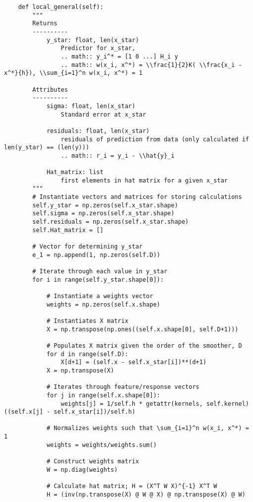 \documentclass[10pt]{article}
\begin{document}
\begin{lstlisting}
    def local_general(self):
        """
        Returns
        ----------
            y_star: float, len(x_star)
                Predictor for x_star, 
                .. math:: y_i^* = [1 0 ...] H_i y
                .. math:: w(x_i, x^*) = \\frac{1}{2}K( \\frac{x_i - x^*}{h}), \\sum_{i=1}^n w(x_i, x^*) = 1

        Attributes
        ----------
            sigma: float, len(x_star)
                Standard error at x_star

            residuals: float, len(x_star)
                residuals of prediction from data (only calculated if len(y_star) == (len(y)))
                .. math:: r_i = y_i - \\hat{y}_i

            Hat_matrix: list
                first elements in hat matrix for a given x_star
        """
        # Instantiate vectors and matrices for storing calculations
        self.y_star = np.zeros(self.x_star.shape)
        self.sigma = np.zeros(self.x_star.shape)
        self.residuals = np.zeros(self.x_star.shape)
        self.Hat_matrix = []

        # Vector for determining y_star
        e_1 = np.append(1, np.zeros(self.D))

        # Iterate through each value in y_star
        for i in range(self.y_star.shape[0]):
            
            # Instantiate a weights vector
            weights = np.zeros(self.x.shape)

            # Instantiates X matrix 
            X = np.transpose(np.ones((self.x.shape[0], self.D+1)))

            # Populates X matrix given the order of the smoother, D
            for d in range(self.D):
                X[d+1] = (self.x - self.x_star[i])**(d+1)
            X = np.transpose(X)

            # Iterates through feature/response vectors
            for j in range(self.x.shape[0]):
                weights[j] = 1/self.h * getattr(kernels, self.kernel)((self.x[j] - self.x_star[i])/self.h)

            # Normalizes weights such that \sum_{i=1}^n w(x_i, x^*) = 1 
            weights = weights/weights.sum()

            # Construct weights matrix
            W = np.diag(weights)

            # Calculate hat matrix; H = (X^T W X)^{-1} X^T W
            H = (inv(np.transpose(X) @ W @ X) @ np.transpose(X) @ W)
            

\end{lstlisting}
\end{document}
